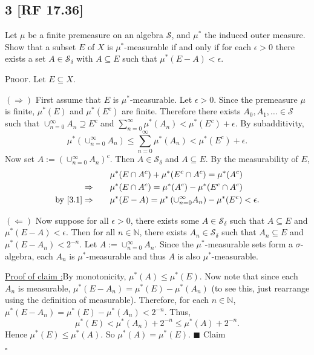 \documentclass[12pt]{article}
\newcounter{ProofCounter}
\newcounter{ClaimCounter}[ProofCounter]
\newenvironment{Proof}{\stepcounter{ProofCounter}\textsc{Proof.}}{\hfill$\square$}
\newenvironment{claim}[1]{\vspace{1mm}\stepcounter{ClaimCounter}\par\noindent\underline{\bf Claim \theClaimCounter:}\space#1}{}
\newenvironment{claimproof}[1]{\par\noindent\underline{Proof of claim \theClaimCounter:}\space#1}{\hfill $\blacksquare$ Claim \theClaimCounter}
\begin{document}
\subsection*{3 [RF 17.36]}
\begin{tcolorbox}
Let $\mu$ be a finite premeasure on an algebra $\mathcal{S}$, and $\mu^{*}$ the induced outer measure. Show that a subset $E$ of $X$ is
$\mu^*$-measurable if and only if for each $\epsilon > 0$ there exists a set $A \in \mathcal{S}_{\delta}$ with $A\subseteq E$ such that $\mu^*(E-A) <
\epsilon$.
\end{tcolorbox}
\begin{Proof} Let $E \subseteq X$.

$(\Rightarrow)$ First assume that $E$ is $\mu^*$-measurable. Let $\epsilon > 0$. Since the premeasure $\mu$ is finite, $\mu^*(E)$ and $\mu^*(E^{c})$ are finite. Therefore
there exists $A_{0}, A_1, \hdots \in \mathcal{S}$ such that $\cup_{n=0}^{\infty}A_{n} \supseteq E^{c}$ and $\sum_{n=0}^{\infty}\mu^*(A_{n}) <
\mu^{*}(E^c) + \epsilon$. By subadditivity,
\begin{equation}
\mu^{*}\left( \cup_{n=0}^{\infty}A_{n} \right) \leq \sum_{n=0}^{\infty}\mu^*(A_{n}) < \mu^*(E^c) + \epsilon.
\label{3.1}
\end{equation}
Now set $A := \left( \cup_{n=0}^{\infty}A_{n} \right)^{c}$. Then $A \in \mathcal{S}_{\delta}$ and $A\subseteq E$. By the measurability of $E$,
\begin{align*}
& \mu^{*}(E\cap A^{c}) + \mu^{*}(E^{c}\cap A^{c}) = \mu^{*}(A^{c}) \\
\Rightarrow \qquad & \mu^{*}(E\cap A^{c}) = \mu^{*}(A^{c}) - \mu^{*}(E^{c}\cap A^{c}) \\
\text{by } \eqref{3.1} \Rightarrow \qquad & \mu^*(E - A) = \mu^*\left( \cup_{n=0}^{\infty}A_{n} \right) - \mu^{*}(E^{c}) < \epsilon.
\end{align*}

$(\Leftarrow)$ Now suppose for all $\epsilon > 0$, there exists some $A \in \mathcal{S}_{\delta}$ such that $A \subseteq E$ and $\mu^{*}(E - A) <
\epsilon$. Then for all $n \in \mathbb{N}$, there exists $A_{n} \in \mathcal{S}_{\delta}$ such that $A_{n} \subseteq E$ and $\mu^{*}(E - A_{n}) < 2^{-n}$.
Let $A := \cup_{n=0}^{\infty}A_{n}$. Since the $\mu^*$-measurable sets form a $\sigma$-algebra, each $A_{n}$ is $\mu^*$-measurable and thus $A$ is
also $\mu^*$-measurable.
\begin{claimproof}
By monotonicity, $\mu^*(A) \leq \mu^*(E)$.
Now note that since each $A_{n}$ is measurable, $\mu^{*}(E - A_{n}) = \mu^*(E) - \mu^*(A_{n})$ (to see this, just rearrange using the definition of measurable).
Therefore, for each $n \in \mathbb{N}$, $\mu^{*}(E - A_{n}) = \mu^{*}(E) - \mu^{*}(A_{n}) < 2^{-n}$. Thus,
\[ \mu^{*}(E) < \mu^{*}(A_{n}) + 2^{-n} \leq \mu^*(A) + 2^{-n}. \]
Hence $\mu^*(E) \leq \mu^*(A)$. So $\mu^{*}(A) = \mu^{*}(E)$.
\end{claimproof}


\end{Proof}
\end{document}
